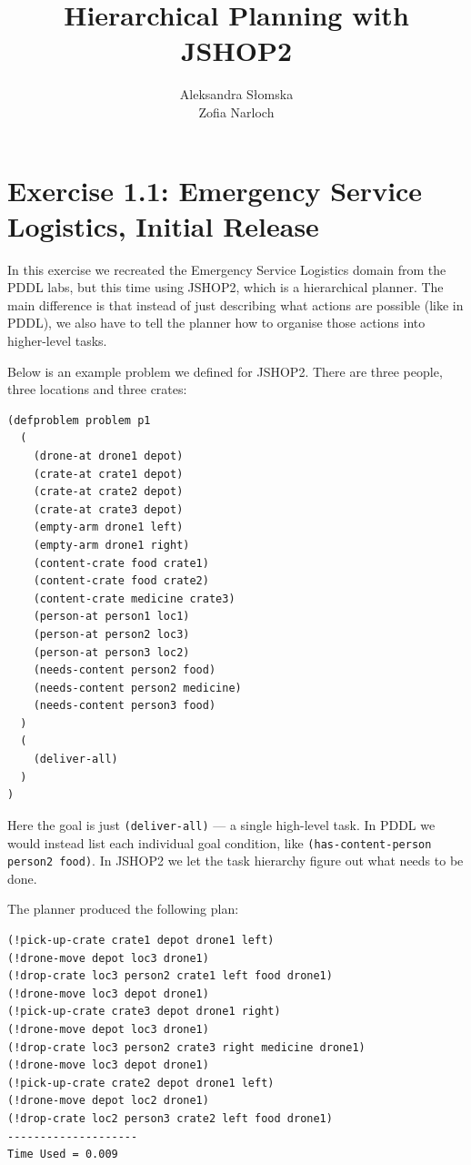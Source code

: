\documentclass{article}
\title{Hierarchical Planning with JSHOP2}
\author{Aleksandra S\l{}omska \\ Zofia Narloch}
\begin{document}
\maketitle

\section{Exercise 1.1: Emergency Service Logistics, Initial Release}

In this exercise we recreated the Emergency Service Logistics domain from the PDDL labs, but this time using JSHOP2, which is a hierarchical planner. The main difference is that instead of just describing what actions are possible (like in PDDL), we also have to tell the planner how to organise those actions into higher-level tasks.

Below is an example problem we defined for JSHOP2. There are three people, three locations and three crates:

\begin{lstlisting}
(defproblem problem p1
  (
    (drone-at drone1 depot)
    (crate-at crate1 depot)
    (crate-at crate2 depot)
    (crate-at crate3 depot)
    (empty-arm drone1 left)
    (empty-arm drone1 right)
    (content-crate food crate1)
    (content-crate food crate2)
    (content-crate medicine crate3)
    (person-at person1 loc1)
    (person-at person2 loc3)
    (person-at person3 loc2)
    (needs-content person2 food)
    (needs-content person2 medicine)
    (needs-content person3 food)
  )
  (
    (deliver-all)
  )
)
\end{lstlisting}

Here the goal is just \texttt{(deliver-all)} --- a single high-level task. In PDDL we would instead list each individual goal condition, like \texttt{(has-content-person person2 food)}. In JSHOP2 we let the task hierarchy figure out what needs to be done.

The planner produced the following plan:

\begin{lstlisting}[caption={First problem and the outcome - three people and three boxes}]
(!pick-up-crate crate1 depot drone1 left)
(!drone-move depot loc3 drone1)
(!drop-crate loc3 person2 crate1 left food drone1)
(!drone-move loc3 depot drone1)
(!pick-up-crate crate3 depot drone1 right)
(!drone-move depot loc3 drone1)
(!drop-crate loc3 person2 crate3 right medicine drone1)
(!drone-move loc3 depot drone1)
(!pick-up-crate crate2 depot drone1 left)
(!drone-move depot loc2 drone1)
(!drop-crate loc2 person3 crate2 left food drone1)
--------------------
Time Used = 0.009
\end{lstlisting}
\end{document}
